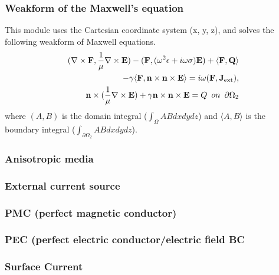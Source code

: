 \documentclass[11pt,a4paper,final]{report}
\begin{document}
\subsubsection{Weakform of the Maxwell's equation}
This module uses the Cartesian coordinate system (x, y, z), and solves the following weakform of Maxwell equations. 
 \begin{align}
(\nabla \times \mathbf{F},  \frac{1}{\mu}\nabla  \times  \mathbf{E})
 - (\mathbf{F},  (\omega^2 \epsilon+ i \omega \sigma)  \mathbf{E}) 
 +  \langle \mathbf{F},  \mathbf{Q} \rangle 
 \notag \\
 - \gamma \langle  \mathbf{F}, \mathbf{n} \times \mathbf{n} \times  \mathbf{E}\rangle = i \omega (\mathbf{F}, \mathbf{J}_{\rm ext} ) ,
\label{em3d_weak} \\
\label{em3d_weakBC} 
 \mathbf{n} \times (\frac{1}{\mu} \nabla \times \mathbf{E}) + \gamma \mathbf{n} \times \mathbf{n} \times  \mathbf{E} = Q\,\,\,on\,\,\,\partial \Omega_{2}
 \end{align}
  where $(A , B)$ is the domain integral ($\int_{\Omega} AB dxdydz$) and $\langle A, B \rangle $ is the boundary integral ($\int_{\partial \Omega_{2}} ABdxdydz$). 
 
 \subsubsection{Anisotropic media}
 
 \subsubsection{External current source}
 
 \subsubsection{PMC (perfect magnetic conductor)}
 
 \subsubsection{PEC (perfect electric conductor/electric field BC}
 
  \subsubsection{Surface Current}
  
\end{document}
